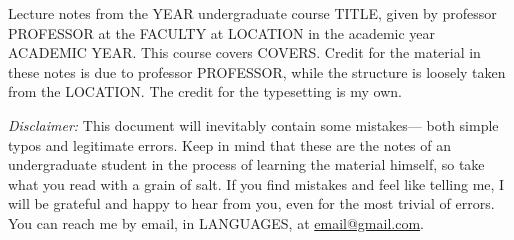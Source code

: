 Lecture notes from the YEAR undergraduate course TITLE, given by professor
PROFESSOR at the FACULTY at LOCATION in the academic year ACADEMIC YEAR. This
course covers COVERS. Credit for the material in these notes is due to professor
PROFESSOR, while the structure is loosely taken from the LOCATION. The credit
for the typesetting is my own.

\textit{Disclaimer:} This document will inevitably contain some mistakes— both
simple typos and legitimate errors. Keep in mind that these are the notes of an
undergraduate student in the process of learning the material himself, so take
what you read with a grain of salt. If you find mistakes and feel like telling
me, I will be grateful and happy to hear from you, even for the most trivial of
errors. You can reach me by email, in LANGUAGES, at
\href{mailto:email@gmail.com}{email@gmail.com}.